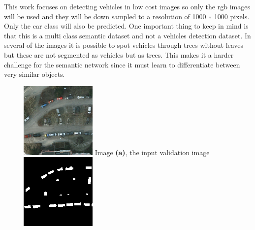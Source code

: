 \documentclass[a4paper,11pt]{article}
\begin{document}
This work focuses on detecting vehicles in low cost images so only the rgb images will be used and they will be down sampled to a resolution of 1000 ∗ 1000 pixels. Only the car class will also be predicted. One important thing to keep in mind is that this is a multi class semantic dataset and not a vehicles detection dataset. In several of the images it is possible to spot vehicles through trees without leaves but these are not segmented as vehicles but as trees. This makes it a harder challenge for the semantic network since it must learn to differentiate between very similar objects.
\begin{figure}[H]
  \includegraphics[width=\linewidth]{trees}
  Image \textbf{(a)}, the input validation image
\endminipage\hfill
{}
  \includegraphics[width=\linewidth]{trees_label}

\end{figure}
\end{document}
